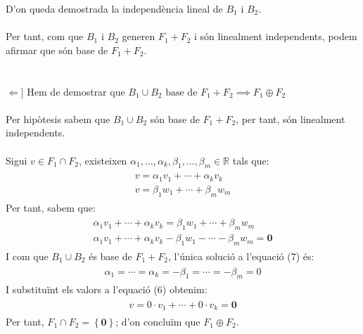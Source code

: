 \documentclass[a4paper, 11pt]{article}
\begin{document}
                D'on queda demostrada la independ\`encia lineal de ${B_1}$ i ${B_2}$.\\\\
                Per tant, com que ${B_1}$ i ${B_2}$ generen ${F_1 + F_2}$ i s\'on linealment independents, podem afirmar que s\'on base de ${F_1 + F_2}$.\\\\\\
            ${\Longleftarrow]}$ Hem de demostrar que ${B_1 \cup B_2 \text{ base de } F_1 + F_2 \implies F_1 \oplus F_2}$\\\\
            Per hip\`otesis sabem que ${B_1 \cup B_2}$ s\'on base de ${F_1 + F_2}$, per tant, s\'on linealment independents.\\\\
            Sigui ${v \in F_1 \cap F_2}$, existeixen ${\alpha_1,\dots,\alpha_k,\beta_1,\dots,\beta_m \in \mathbb{R}}$ tals que:
            \begin{align}
                \begin{aligned}
                    v = \alpha_1v_1 + \cdots + \alpha_k v_k\\
                    v = \beta_1 w_1 + \cdots + \beta_m w_m
                \end{aligned}
            \end{align}
            Per tant, sabem que:
            \begin{align}
                \begin{aligned}
                    \alpha_1v_1 + \cdots + \alpha_k v_k = \beta_1 w_1 + \cdots + \beta_m w_m\\
                    \alpha_1v_1 + \cdots + \alpha_k v_k -\beta_1 w_1 - \cdots -\beta_m w_m = \mathbf{0}
                \end{aligned}
            \end{align}
            I com que ${B_1 \cup B_2}$ \'es base de ${F_1 + F_2}$, l'\'unica solució a l'equaci\'o (7) \'es:
            \begin{align}
                \begin{aligned}
                    \alpha_1 = \cdots = \alpha_k = -\beta_1 = \cdots = -\beta_m = 0
                \end{aligned}
            \end{align}
            I substitu\"int els valors a l'equaci\'o (6) obtenim:
            \begin{align}
                \begin{aligned}
                    v = 0\cdot v_1 +\cdots+ 0\cdot v_k = \mathbf{0}
                \end{aligned}
            \end{align}
            Per tant, ${F_1 \cap F_2 = \left\{\mathbf{0}\right\}}$; d'on conclu\"im que ${F_1 \oplus F_2}$.
\end{document}
